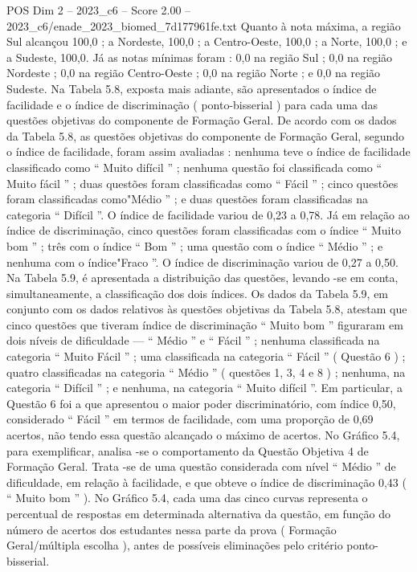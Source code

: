 \begin{textsample}{POS Dim 2 – 2023\_c6 – Score 2.00 – 2023\_c6/enade\_2023\_biomed\_7d177961fe.txt}
Quanto à nota máxima, a região Sul alcançou 100,0 ; a Nordeste, 100,0 ; a Centro-Oeste, 100,0 ; a Norte, 100,0 ; e a Sudeste, 100,0.
Já as notas mínimas foram : 0,0 na região Sul ; 0,0 na região Nordeste ; 0,0 na região Centro-Oeste ; 0,0 na região Norte ; e 0,0 na região Sudeste.
Na Tabela 5.8, exposta mais adiante, são apresentados o índice de facilidade e o índice de discriminação ( ponto-bisserial ) para cada uma das questões objetivas do componente de Formação Geral.
De acordo com os dados da Tabela 5.8, as questões objetivas do componente de Formação Geral, segundo o índice de facilidade, foram assim avaliadas : nenhuma teve o índice de facilidade classificado como “ Muito difícil ” ; nenhuma questão foi classificada como “ Muito fácil ” ; duas questões foram classificadas como “ Fácil ” ; cinco questões foram classificadas como"Médio ” ; e duas questões foram classificadas na categoria “ Difícil ”.
O índice de facilidade variou de 0,23 a 0,78.
Já em relação ao índice de discriminação, cinco questões foram classificadas com o índice “ Muito bom ” ; três com o índice “ Bom ” ; uma questão com o índice “ Médio ” ; e nenhuma com o índice"Fraco ”.
O índice de discriminação variou de 0,27 a 0,50.
Na Tabela 5.9, é apresentada a distribuição das questões, levando -se em conta, simultaneamente, a classificação dos dois índices.
Os dados da Tabela 5.9, em conjunto com os dados relativos às questões objetivas da Tabela 5.8, atestam que cinco questões que tiveram índice de discriminação “ Muito bom ” figuraram em dois níveis de dificuldade — “ Médio ” e “ Fácil ” ; nenhuma classificada na categoria “ Muito Fácil ” ; uma classificada na categoria “ Fácil ” ( Questão 6 ) ; quatro classificadas na categoria “ Médio ” ( questões 1, 3, 4 e 8 ) ; nenhuma, na categoria “ Difícil ” ; e nenhuma, na categoria “ Muito difícil ”.
Em particular, a Questão 6 foi a que apresentou o maior poder discriminatório, com índice 0,50, considerado “ Fácil ” em termos de facilidade, com uma proporção de 0,69 acertos, não tendo essa questão alcançado o máximo de acertos.
No Gráfico 5.4, para exemplificar, analisa -se o comportamento da Questão Objetiva 4 de Formação Geral.
Trata -se de uma questão considerada com nível “ Médio ” de dificuldade, em relação à facilidade, e que obteve o índice de discriminação 0,43 ( “ Muito bom ” ).
No Gráfico 5.4, cada uma das cinco curvas representa o percentual de respostas em determinada alternativa da questão, em função do número de acertos dos estudantes nessa parte da prova ( Formação Geral/múltipla escolha ), antes de possíveis eliminações pelo critério ponto-bisserial.

\end{textsample}
